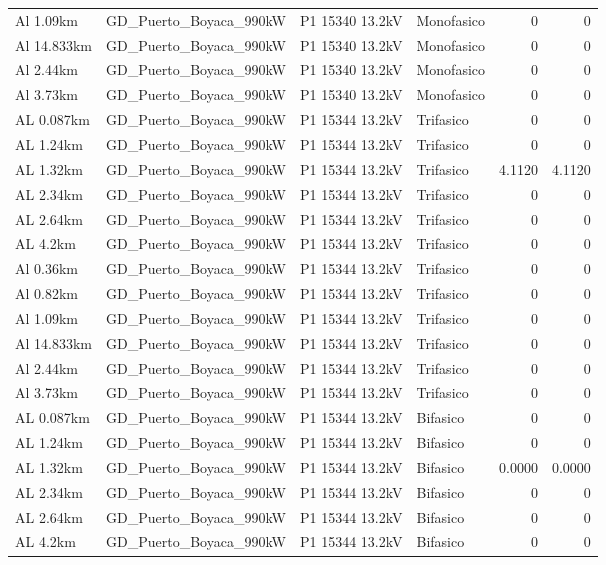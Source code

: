 \documentclass[11pt,a4paper]{article}
\begin{document}
\begin{longtable}{llllrr}
Al 1.09km & GD\_Puerto\_Boyaca\_990kW & P1 15340 13.2kV & Monofasico & 0 & 0 \\
Al 14.833km & GD\_Puerto\_Boyaca\_990kW & P1 15340 13.2kV & Monofasico & 0 & 0 \\
Al 2.44km & GD\_Puerto\_Boyaca\_990kW & P1 15340 13.2kV & Monofasico & 0 & 0 \\
Al 3.73km & GD\_Puerto\_Boyaca\_990kW & P1 15340 13.2kV & Monofasico & 0 & 0 \\
AL 0.087km & GD\_Puerto\_Boyaca\_990kW & P1 15344 13.2kV & Trifasico & 0 & 0 \\
AL 1.24km & GD\_Puerto\_Boyaca\_990kW & P1 15344 13.2kV & Trifasico & 0 & 0 \\
AL 1.32km & GD\_Puerto\_Boyaca\_990kW & P1 15344 13.2kV & Trifasico & 4.1120 & 4.1120 \\
AL 2.34km & GD\_Puerto\_Boyaca\_990kW & P1 15344 13.2kV & Trifasico & 0 & 0 \\
AL 2.64km & GD\_Puerto\_Boyaca\_990kW & P1 15344 13.2kV & Trifasico & 0 & 0 \\
AL 4.2km & GD\_Puerto\_Boyaca\_990kW & P1 15344 13.2kV & Trifasico & 0 & 0 \\
Al 0.36km & GD\_Puerto\_Boyaca\_990kW & P1 15344 13.2kV & Trifasico & 0 & 0 \\
Al 0.82km & GD\_Puerto\_Boyaca\_990kW & P1 15344 13.2kV & Trifasico & 0 & 0 \\
Al 1.09km & GD\_Puerto\_Boyaca\_990kW & P1 15344 13.2kV & Trifasico & 0 & 0 \\
Al 14.833km & GD\_Puerto\_Boyaca\_990kW & P1 15344 13.2kV & Trifasico & 0 & 0 \\
Al 2.44km & GD\_Puerto\_Boyaca\_990kW & P1 15344 13.2kV & Trifasico & 0 & 0 \\
Al 3.73km & GD\_Puerto\_Boyaca\_990kW & P1 15344 13.2kV & Trifasico & 0 & 0 \\
AL 0.087km & GD\_Puerto\_Boyaca\_990kW & P1 15344 13.2kV & Bifasico & 0 & 0 \\
AL 1.24km & GD\_Puerto\_Boyaca\_990kW & P1 15344 13.2kV & Bifasico & 0 & 0 \\
AL 1.32km & GD\_Puerto\_Boyaca\_990kW & P1 15344 13.2kV & Bifasico & 0.0000 & 0.0000 \\
AL 2.34km & GD\_Puerto\_Boyaca\_990kW & P1 15344 13.2kV & Bifasico & 0 & 0 \\
AL 2.64km & GD\_Puerto\_Boyaca\_990kW & P1 15344 13.2kV & Bifasico & 0 & 0 \\
AL 4.2km & GD\_Puerto\_Boyaca\_990kW & P1 15344 13.2kV & Bifasico & 0 & 0 \\

\end{longtable}
\end{document}
